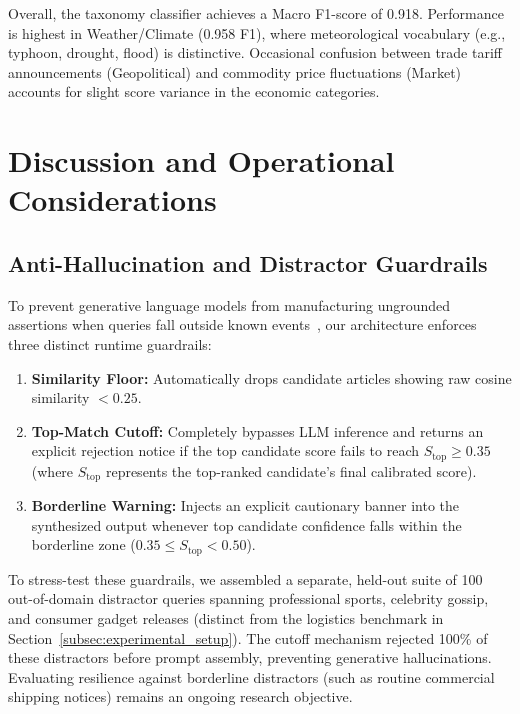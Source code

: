 \documentclass[conference]{IEEEtran}
\begin{document}
Overall, the taxonomy classifier achieves a Macro F1-score of 0.918. Performance is highest in Weather/Climate (0.958 F1), where meteorological vocabulary (e.g., typhoon, drought, flood) is distinctive. Occasional confusion between trade tariff announcements (Geopolitical) and commodity price fluctuations (Market) accounts for slight score variance in the economic categories.

\section{Discussion and Operational Considerations}

\subsection{Anti-Hallucination and Distractor Guardrails}
To prevent generative language models from manufacturing ungrounded assertions when queries fall outside known events~\cite{ma2025survey}, our architecture enforces three distinct runtime guardrails:
\begin{enumerate}[label=(\arabic*)]
    \item \textbf{Similarity Floor:} Automatically drops candidate articles showing raw cosine similarity $<0.25$.
    \item \textbf{Top-Match Cutoff:} Completely bypasses LLM inference and returns an explicit rejection notice if the top candidate score fails to reach $S_{\text{top}} \ge 0.35$ (where $S_{\text{top}}$ represents the top-ranked candidate's final calibrated score).
    \item \textbf{Borderline Warning:} Injects an explicit cautionary banner into the synthesized output whenever top candidate confidence falls within the borderline zone ($0.35 \le S_{\text{top}} < 0.50$).
\end{enumerate}

To stress-test these guardrails, we assembled a separate, held-out suite of 100 out-of-domain distractor queries spanning professional sports, celebrity gossip, and consumer gadget releases (distinct from the logistics benchmark in Section~\ref{subsec:experimental_setup}). The cutoff mechanism rejected 100\% of these distractors before prompt assembly, preventing generative hallucinations. Evaluating resilience against borderline distractors (such as routine commercial shipping notices) remains an ongoing research objective.
\end{document}

